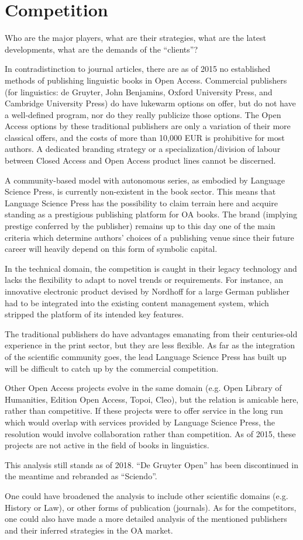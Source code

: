 \documentclass[nonflat,smallfont
]{langsci/langscibook}
\newcommand{\background}[1]{ 
  \vspace{5mm}
  \renewcommand{\tblslinecolour}{lsDarkBlue}
  \tblssy[red]{explore2}{Background}{\vspace*{-5mm}#1}
}
\newcommand{\langscisolution}[1]{
  \renewcommand{\tblslinecolour}{lsLightBlue}
  \tblssy{langsci}{LangSci solution}{\vspace*{-5mm}#1}
}
\newcommand{\evaluation}[1]{
  \renewcommand{\tblslinecolour}{lsLightOrange}
  \tblssy{receipt}{Evaluation}{\vspace*{-5mm}#1}
}
\newcommand{\othersolutions}[1]{
  \renewcommand{\tblslinecolour}{lsDarkGreenOne}
  \tblssy{more}{Other solutions}{\vspace*{-5mm}#1}
}
\renewcommand{\tblssy}[4][black!12]{%
  \renewcommand{\langscisymbol}{#2}\renewcommand{\tblsboxcolor}{#1}
  \begin{mdframed}[style=yellowexercise,frametitle={#3}]
    #4
  \end{mdframed}
}
\begin{document}
 
\section{Competition }
\background{Who are the major players, what are their strategies, what are the latest developments, what are the demands of the ``clients''?}
\langscisolution{
In contradistinction to journal articles, there are as of 2015 no established methods of publishing linguistic books in Open Access. Commercial publishers (for linguistics: de Gruyter, John Benjamins, Oxford University Press, and Cambridge University Press) do have lukewarm options on offer, but do not have a well-defined program, nor do they really publicize those options. The Open Access options by these traditional publishers are only a variation of their more classical offers, and the costs of more than 10,000 EUR is prohibitive for most authors. A dedicated branding strategy or a specialization/division of labour between Closed Access and Open Access product lines cannot be discerned.

A community-based model with autonomous series, as embodied by Language Science Press, is currently non-existent in the book sector. This means that Language Science Press has the possibility to claim terrain here and acquire standing as a prestigious publishing platform for OA books.  The brand (implying prestige conferred by the publisher) remains up to this day one of the main criteria which determine authors' choices of a publishing venue since their future career will heavily depend on this form of symbolic capital. 

In the technical domain, the competition is caught in their legacy technology and lacks the flexibility to adapt to novel trends or requirements. For instance, an innovative electronic product devised by Nordhoff for a large German publisher had to be integrated into the existing content management system, which stripped the platform of its intended key features. 

The traditional publishers do have advantages emanating from their centuries-old experience in the print sector, but they are less flexible. As far as the integration of the scientific community goes, the lead Language Science Press has built up will be difficult to catch up by the commercial competition.  

Other Open Access projects evolve in the same domain (e.g. Open Library of Humanities, Edition Open Access, Topoi, Cleo), but the relation is amicable here, rather than competitive.
If these projects were to offer service in the long run which would overlap with services provided by Language Science Press, the resolution would involve collaboration rather than competition. As of 2015, these projects are not active in the field of books in linguistics. 
}
\evaluation{This analysis still stands as of 2018. ``De Gruyter Open'' has been discontinued in the meantime and rebranded as ``Sciendo''. }
\largerpage
\othersolutions{One could have broadened the analysis to include other scientific domains (e.g. History or Law), or other forms of publication (journals). As for the competitors, one could also have made a more detailed analysis of the mentioned publishers and their inferred strategies in the OA market.}
 
\end{document}
